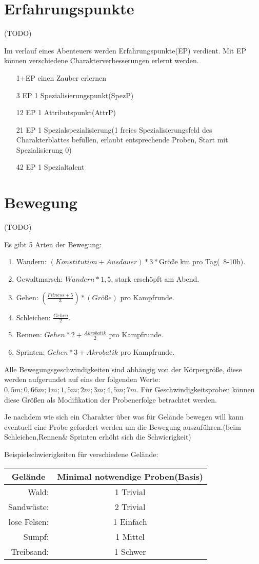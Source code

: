 \section{Erfahrungspunkte}
(TODO)

Im verlauf eines Abenteuers werden Erfahrungspunkte(EP) verdient. Mit EP können verschiedene Charakterverbesserungen erlernt werden.
\begin{enumerate}
\item[1+EP] einen Zauber erlernen
\item[3 EP] 1 Spezialisierungspunkt(SpezP)
\item[12 EP] 1 Attributspunkt(AttrP)
\item[21 EP] 1 Spezialspezialisierung(1 freies Spezialisierungsfeld des Charakterblattes befüllen, erlaubt entsprechende Proben, Start mit Spezialisierung 0)
\item[42 EP] 1 Spezialtalent
\end{enumerate}
	
\section{Bewegung}
(TODO)

Es gibt 5 Arten der Bewegung:
\begin{enumerate}
\item Wandern: $(Konstitution + Ausdauer) * 3 * $Größe km pro Tag(~8-10h).
\item Gewaltmarsch: $Wandern * 1,5$, stark erschöpft am Abend.
\item Gehen: $(\frac{Fitness + 5}{3}) * (Größe)$ pro Kampfrunde.
\item Schleichen: $\frac{Gehen}{2}$.
\item Rennen: $Gehen * 2 + \frac{Akrobatik}{2}$ pro Kampfrunde.
\item Sprinten: $Gehen * 3 + Akrobatik$ pro Kampfrunde.
\end{enumerate}
Alle Bewegungsgeschwindigkeiten sind abhängig von der Körpergröße, diese werden aufgerundet auf eins der folgenden Werte: $0,5m; 0,66m; 1m; 1,5m; 2m; 3m; 4,5m; 7m$. Für Geschwindigkeitsproben können diese Größen als Modifikation der Probenerfolge betrachtet werden.

Je nachdem wie sich ein Charakter über was für Gelände bewegen will kann eventuell eine Probe gefordert werden um die Bewegung auszuführen.(beim Schleichen,Rennen\& Sprinten erhöht sich die Schwierigkeit)

Beispielschwierigkeiten für verschiedene Gelände:
\begin{tabular}{rc}
\multicolumn{1}{c}{Gelände} & Minimal notwendige Proben(Basis)\\
\hline
Wald: & 1 Trivial\\
Sandwüste: & 2 Trivial\\
lose Felsen: & 1 Einfach\\
Sumpf: & 1 Mittel\\
Treibsand: & 1 Schwer\\
\end{tabular}


